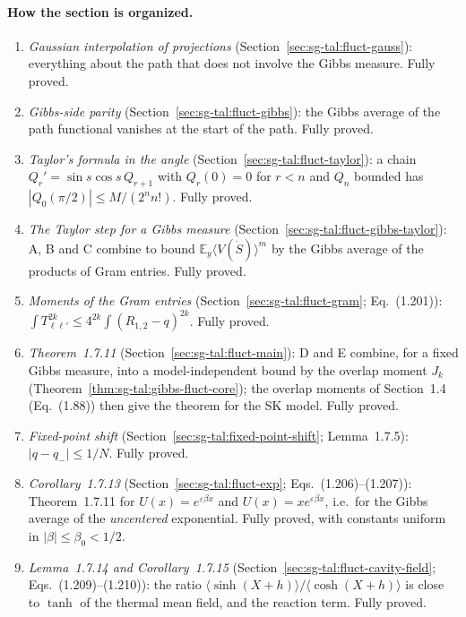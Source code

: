 \paragraph{How the section is organized.}
\begin{enumerate}
\item[A.] \emph{Gaussian interpolation of projections} (Section~\ref{sec:sg-tal:fluct-gauss}): everything about the path
  that does not involve the Gibbs measure.  Fully proved.
\item[B.] \emph{Gibbs-side parity} (Section~\ref{sec:sg-tal:fluct-gibbs}): the Gibbs average of the path functional vanishes at the
  start of the path.  Fully proved.
\item[C.] \emph{Taylor's formula in the angle} (Section~\ref{sec:sg-tal:fluct-taylor}): a chain $Q_r'=\sin s\cos s\,Q_{r+1}$ with
  $Q_r(0)=0$ for $r<n$ and $Q_n$ bounded has $|Q_0(\pi/2)|\le M/(2^nn!)$.  Fully proved.
\item[D.] \emph{The Taylor step for a Gibbs measure} (Section~\ref{sec:sg-tal:fluct-gibbs-taylor}): A, B and C combine to bound
  $\mathbb E_y\langle V(\dot S)\rangle^m$ by the Gibbs average of the products of Gram entries.  Fully proved.
\item[E.] \emph{Moments of the Gram entries} (Section~\ref{sec:sg-tal:fluct-gram}; Eq.~(1.201)): $\int T_{\ell\ell'}^{2k}\le4^{2k}\int(R_{1,2}-q)^{2k}$.  Fully proved.
\item[F.] \emph{Theorem~1.7.11} (Section~\ref{sec:sg-tal:fluct-main}): D and E combine, for a fixed Gibbs measure, into a model-independent bound by the overlap moment $J_k$ (Theorem~\ref{thm:sg-tal:gibbs-fluct-core}); the overlap moments of Section~1.4 (Eq.~(1.88)) then give the theorem for the SK model.  Fully proved.
\item[G.] \emph{Fixed-point shift} (Section~\ref{sec:sg-tal:fixed-point-shift}; Lemma~1.7.5): $|q - q_-|\le 1/N$.  Fully proved.
\item[H.] \emph{Corollary~1.7.13} (Section~\ref{sec:sg-tal:fluct-exp}; Eqs.~(1.206)--(1.207)): Theorem~1.7.11 for $U(x)=e^{\varepsilon\beta x}$ and $U(x)=xe^{\varepsilon\beta x}$, i.e.\ for the Gibbs average of the \emph{uncentered} exponential.  Fully proved, with constants uniform in $|\beta|\le\beta_0<1/2$.
\item[I.] \emph{Lemma~1.7.14 and Corollary~1.7.15} (Section~\ref{sec:sg-tal:fluct-cavity-field}; Eqs.~(1.209)--(1.210)): the ratio $\langle\sinh(X+h)\rangle/\langle\cosh(X+h)\rangle$ is close to $\tanh$ of the thermal mean field, and the reaction term.  Fully proved.

\end{enumerate}
